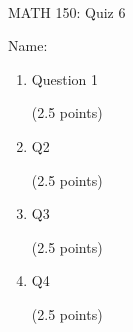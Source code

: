 \documentclass[11pt]{article}
\newcommand{\vs}{\vspace{0.2in}}
\begin{document}
\tt
\centerline{MATH 150: Quiz 6}
\vs

Name: \underline{\hspace{5cm}}

\medskip

\begin{enumerate}

\item
Question 1

(2.5 points)
\vspace{3in}

\item
Q2

(2.5 points)

\newpage

\item
Q3

(2.5 points)
\vspace{3in}

\item
Q4

(2.5 points)

\end{enumerate}
\end{document}
